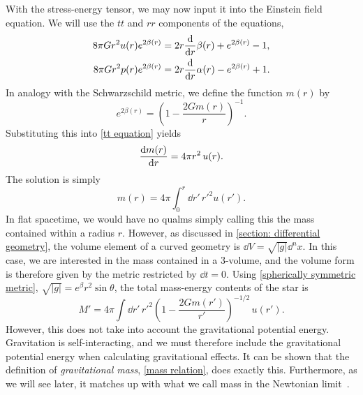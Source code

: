 With the stress-energy tensor, we may now input it into the Einstein field equation.
We will use the $tt$ and $rr$ components of the equations, 
%
\begin{align}
    \label{tt equation}
    8 \pi G r^{2} u{\left(r \right)} e^{2 \beta{\left(r \right)}} 
    & =   2 r \odv{}{r} \beta{\left(r \right)} + e^{2 \beta{\left(r \right)}} - 1, \\
    \label{rr equation}
    8 \pi G r^{2} p{\left(r \right)} e^{2 \beta{\left(r \right)}} 
    & = 2 r \odv{}{r}\alpha{\left(r \right)} - e^{2 \beta{\left(r \right)}} + 1.
\end{align}
%
In analogy with the Schwarzschild metric, we define the function $m(r)$ by
%
\begin{equation}
    \label{definition of m(r)}
    e^{2 \beta(r)} = \left(1 - \frac{2 G m(r)}{r} \right)^{-1}. 
\end{equation}
%
Substituting this into \autoref{tt equation} yields 
%
\begin{equation}
    \label{diff eq mass}
    \odv{m(r)}{r} = 4 \pi r^2 \, u(r).
\end{equation}
%
The solution is simply
%
\begin{equation}
    \label{mass relation}
    m(r) = 4 \pi \int_0^r \dd r' \, {r'}^2 u(r').
\end{equation}
%
In flat spacetime, we would have no qualms simply calling this the mass contained within a radius $r$.
However, as discussed in \autoref{section: differential geometry}, the volume element of a curved geometry is $\dd V = \sqrt{|g|} \dd^n x$.
In this case, we are interested in the mass contained in a 3-volume, and the volume form is therefore given by the metric restricted by $\dd t = 0$.
Using \autoref{spherically symmetric metric}, $\sqrt{|g|} = e^{\beta} r^2 \sin \theta$, the total mass-energy contents of the star is 
%
\begin{equation}
    M' = 4 \pi \int \dd r' \, {r'}^2 \left(1 - \frac{2 G m(r')}{r'}\right)^{-1/2}\, u(r').
\end{equation}
%
However, this does not take into account the gravitational potential energy.
Gravitation is self-interacting, and we must therefore include the gravitational potential energy when calculating gravitational effects.
It can be shown that the definition of \emph{gravitational mass}, \autoref{mass relation}, does exactly this.
Furthermore, as we will see later, it matches up with what we call mass in the Newtonian limit~\autocite{misnerGravitation2009}.


